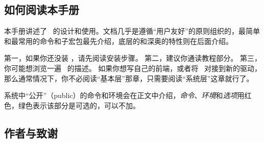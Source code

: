 \subsection{如何阅读本手册}

\begin{onehalfspacing}

本手册讲述了 \tikzname\ 的设计和使用。文档几乎是遵循“用户友好”的原则组织的，最简单和最常用的命令和子宏包最先介绍，底层的和深奥的特性则在后面介绍。

第一，如果你还没装 \tikzname，请先阅读安装步骤。
第二，建议你通读教程部分。
第三，你可能想浏览一遍 \tikzname\ 的描述。
如果你想写自己的前端，或者将 \pgfname\ 对接到新的驱动，那么通常情况下，你不必阅读“基本层”那章，只需要阅读“系统层”这章就行了。

系统中“公开”（public）的命令和环境会在正文中介绍，\emph{命令}、\emph{环境}和\emph{选项}用红色，绿色表示该部分是可选的，可以不加。

\end{onehalfspacing}

\subsection{作者与致谢}
\label{section-authors}

